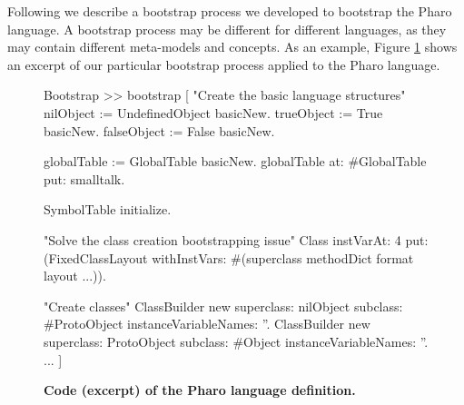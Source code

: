 Following we describe a bootstrap process we developed to bootstrap the Pharo language. A bootstrap process may be different for different languages, as they may contain different meta-models and concepts. As an example, Figure \ref{code:process} shows an excerpt of our particular bootstrap process applied to the Pharo language.

\begin{figure}[ht]
\begin{code}
Bootstrap >> bootstrap [
    "Create the basic language structures"
    nilObject := UndefinedObject basicNew.
    trueObject := True basicNew.
    falseObject := False basicNew.
    
    globalTable := GlobalTable basicNew.
    globalTable at: #GlobalTable put: smalltalk.
    
    SymbolTable initialize.
    
    "Solve the class creation bootstrapping issue"
    Class
        instVarAt: 4
        put: (FixedClassLayout
            withInstVars: #(superclass methodDict format layout ...)).
    
    "Create classes"
    ClassBuilder new
        superclass: nilObject
        subclass: #ProtoObject
        instanceVariableNames: ''.
    ClassBuilder new
        superclass: ProtoObject
        subclass: #Object
        instanceVariableNames: ''.
    ...
]
\end{code}
\caption{\textbf{Code (excerpt) of the Pharo language definition.}\label{code:process}}
\end{figure}



%

